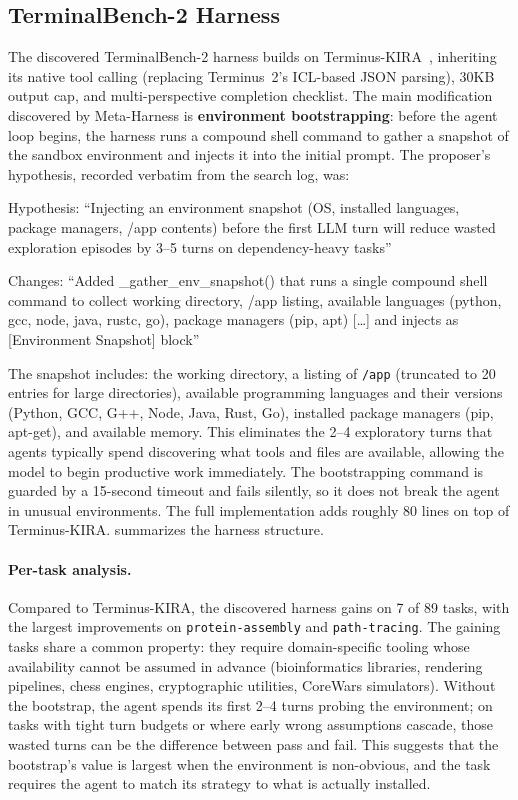 \subsection{TerminalBench-2 Harness}
\label{app:tbench-harness}

The discovered TerminalBench-2 harness builds on Terminus-KIRA~\citep{terminuskira2026}, inheriting its native tool calling (replacing Terminus~2's ICL-based JSON parsing), 30KB output cap, and multi-perspective completion checklist.
The main modification discovered by Meta-Harness is \textbf{environment bootstrapping}: before the agent loop begins, the harness runs a compound shell command to gather a snapshot of the sandbox environment and injects it into the initial prompt.
The proposer's hypothesis, recorded verbatim from the search log, was:

\begin{logbox}
Hypothesis: ``Injecting an environment snapshot (OS, installed languages, package managers, /app contents) before the first LLM turn will reduce wasted exploration episodes by 3--5 turns on dependency-heavy tasks''

Changes: ``Added \_gather\_env\_snapshot() that runs a single compound shell command to collect working directory, /app listing, available languages (python, gcc, node, java, rustc, go), package managers (pip, apt) [\ldots] and injects as [Environment Snapshot] block''
\end{logbox}

The snapshot includes: the working directory, a listing of \texttt{/app} (truncated to 20 entries for large directories), available programming languages and their versions (Python, GCC, G++, Node, Java, Rust, Go), installed package managers (pip, apt-get), and available memory.
This eliminates the 2--4 exploratory turns that agents typically spend discovering what tools and files are available, allowing the model to begin productive work immediately.
The bootstrapping command is guarded by a 15-second timeout and fails silently, so it does not break the agent in unusual environments.
The full implementation adds roughly 80 lines on top of Terminus-KIRA.
 summarizes the harness structure.

\paragraph{Per-task analysis.}
Compared to Terminus-KIRA, the discovered harness gains on 7 of 89 tasks, with the largest improvements on \texttt{protein-assembly} and \texttt{path-tracing}.
The gaining tasks share a common property: they require domain-specific tooling whose availability cannot be assumed in advance (bioinformatics libraries, rendering pipelines, chess engines, cryptographic utilities, CoreWars simulators).
Without the bootstrap, the agent spends its first 2--4 turns probing the environment; on tasks with tight turn budgets or where early wrong assumptions cascade, those wasted turns can be the difference between pass and fail.
This suggests that the bootstrap's value is largest when the environment is non-obvious, and the task requires the agent to match its strategy to what is actually installed.

